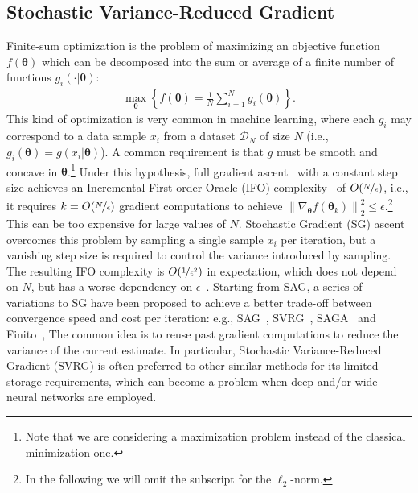 \documentclass{article}
\makeatletter
\theoremstyle{remark}
\theoremstyle{definition}
\DeclareRobustCommand{\eg}{e.g.,\@\xspace}
\DeclareRobustCommand{\ie}{i.e.,\@\xspace}
\newcommand{\norm}[2][\infty]{\left\|#2\right\|_{#1}}
\newcommand{\vtheta}{\boldsymbol{\theta}}
\makeatother
\begin{document}
\subsection{Stochastic Variance-Reduced Gradient}
Finite-sum optimization is the problem of maximizing an objective function $f(\vtheta)$ which can be decomposed into the sum or average of a finite number of functions $g_i(\cdot|\vtheta)$:
\begin{align*}
        \max_{\vtheta} \left\{ f(\vtheta) = \frac{1}{N}\sum_{i=1}^{N}g_i(\vtheta)\right\}.
\end{align*}
This kind of optimization is very common in machine learning, where each $g_i$ may correspond to a data sample $x_i$ from a dataset $\mathcal{D}_N$ of size $N$ (\ie $g_i(\vtheta) = g(x_i|\vtheta)$). 
A common requirement is that $g$ must be smooth and {\color{red} concave} in $\vtheta$.\footnote{Note that we are considering a maximization problem instead of the classical minimization one.} Under this hypothesis, full gradient ascent~\citep{cauchy1847methode} with a constant step size achieves an Incremental First-order Oracle (IFO) complexity~\citep{agarwal2014lower} of $O(\nicefrac{N}{\epsilon})$, \ie it requires $k = O(\nicefrac{N}{\epsilon})$ gradient computations to achieve $\norm[2]{\nabla_{\vtheta}f(\vtheta_k)}^2\leq\epsilon$.\footnote{In the following we will omit the subscript for the $\ell_2$-norm.} 
This can be too expensive for large values of $N$. Stochastic Gradient (SG) ascent~\citep[\eg][]{robbins1951stochastic,bottou2004large} overcomes this problem by sampling a single sample $x_i$ per iteration, but a vanishing step size is required to control the variance introduced by sampling. The resulting IFO complexity is $O(\nicefrac{1}{\epsilon^2})$ in expectation, which does not depend on $N$, but has a worse dependency on $\epsilon$~\cite{nemirovskii1983problem,reddi2016stochastic}.
Starting from SAG, a series of variations to SG have been proposed to achieve a better trade-off between convergence speed and cost per iteration: \eg SAG~\citep{roux2012stochastic}, SVRG~\cite{johnson2013accelerating}, SAGA~\cite{defazio2014saga} and Finito~\cite{defazio2014finito}, 
The common idea is to reuse past gradient computations to reduce the variance of the current estimate.
In particular, Stochastic Variance-Reduced Gradient (SVRG) is often preferred to other similar methods for its limited storage requirements, which can become a problem when deep and/or wide neural networks are employed.  
\end{document}
